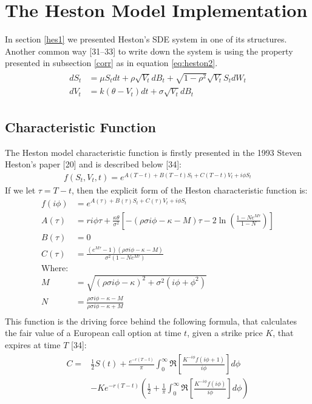 \documentclass[12pt,twoside]{reedthesis}
\theoremstyle{definition}
\theoremstyle{definition}
\theoremstyle{remark}
\begin{document}
  \chapter{The Heston Model Implementation}\label{implement}
  
  In section \ref{hes1} we presented Heston's SDE system in one of its
  structures. Another common way {[}31--33{]} to write down the system is
  using the property presented in subsection \ref{corr} as in equation
  \eqref{eq:heston2}.
  \begin{align}
  \label{eq:heston2}
  \begin{split}
  dS_t &= \mu S_t dt + \rho \sqrt{V_t} dB_t + \sqrt{1 - \rho^2} \sqrt{V_t} S_t dW_t \\
  dV_t &= k(\theta - V_t)dt + \sigma \sqrt{V_t} dB_t 
  \end{split}
  \end{align}
  \section{Characteristic Function}\label{characteristic-function}
  
  The Heston model characteristic function is firstly presented in the
  1993 Steven Heston's paper {[}20{]} and is described below {[}34{]}:
  \begin{align}
  f(S_t, V_t, t) = e^{A(T-t)+B(T-t)S_t + C(T-t)V_t + i \phi S_t}
  \end{align}
  If we let \(\tau = T-t\), then the explicit form of the Heston
  characteristic function is:
  \begin{align*}
  f(i \phi) &= e^{A(\tau)+B(\tau)S_t + C(\tau)V_t + i \phi S_t} \\
  A(\tau) &= r i \phi \tau + \frac{\kappa \theta}{\sigma^2} \left[ - (\rho \sigma i \phi - \kappa - M) \tau - 2 \ln\left(\frac{1-N e^{M \tau}}{1-N}\right) \right] \\
  B(\tau) &= 0 \\
  C(\tau) &= \frac{(e^{M \tau}-1)(\rho \sigma i \phi - \kappa - M)}{\sigma^2 (1-N e^{M \tau})} \\
  \text{Where:} & \\
  M &= \sqrt{(\rho \sigma i \phi - \kappa)^2 + \sigma^2 (i \phi + \phi^2)} \\
  N &= \frac{\rho \sigma i \phi - \kappa - M}{\rho \sigma i \phi - \kappa + M} \\
  \end{align*}
  This function is the driving force behind the following formula, that
  calculates the fair value of a European call option at time \(t\), given
  a strike price \(K\), that expires at time \(T\) {[}34{]}:
  \begin{align} 
  \label{eq:cfheston}
  \begin{split}
  C = & \frac{1}{2} S(t) + \frac{e^{-r(T-t)}}{\pi}\int_{0}^{\infty}{\Re \left[ \frac{K^{-i \phi} f(i \phi + 1)}{i \phi} \right] d\phi} \\
  & -Ke^{-r(T-t)}\left( \frac{1}{2} + \frac{1}{\pi} \int_{0}^{\infty}{\Re \left[ \frac{K^{-i \phi} f(i \phi)}{i \phi} \right]}  d\phi \right)
  \end{split}
  \end{align}
\end{document}
